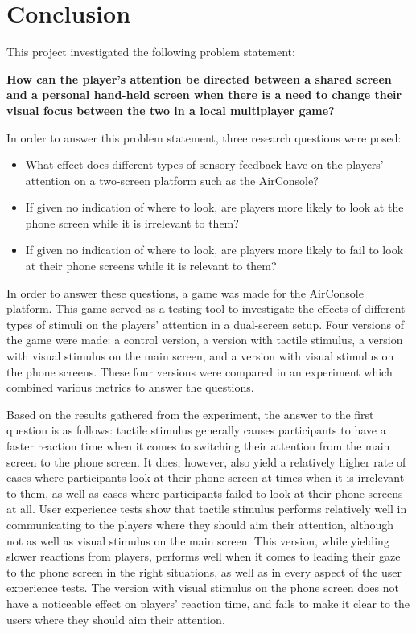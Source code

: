 \chapter{Conclusion}\label{ch:conclusion}
This project investigated the following problem statement:

\begin{changemargin}{1cm}{1cm}
\textbf{How can the player’s attention be directed between a shared screen and a personal hand-held screen when there is a need to change their visual focus between the two in a local multiplayer game?}
\end{changemargin}

In order to answer this problem statement, three research questions were posed:

\begin{itemize}
\item What effect does different types of sensory feedback have on the players' attention on a two-screen platform such as the AirConsole?
\item If given no indication of where to look, are players more likely to look at the phone screen while it is irrelevant to them?
\item If given no indication of where to look, are players more likely to fail to look at their phone screens while it is relevant to them?
\end{itemize}

In order to answer these questions, a game was made for the AirConsole platform. This game served as a testing tool to investigate the effects of different types of stimuli on the players’ attention in a dual-screen setup. Four versions of the game were made: a control version, a version with tactile stimulus, a version with visual stimulus on the main screen, and a version with visual stimulus on the phone screens. These four versions were compared in an experiment which combined various metrics to answer the questions.

Based on the results gathered from the experiment, the answer to the first question is as follows: tactile stimulus generally causes participants to have a faster reaction time when it comes to switching their attention from the main screen to the phone screen. It does, however, also yield a relatively higher rate of cases where participants look at their phone screen at times when it is irrelevant to them, as well as cases where participants failed to look at their phone screens at all. User experience tests show that tactile stimulus performs relatively well in communicating to the players where they should aim their attention, although not as well as visual stimulus on the main screen. This version, while yielding slower reactions from players, performs well when it comes to leading their gaze to the phone screen in the right situations, as well as in every aspect of the user experience tests. The version with visual stimulus on the phone screen does not have a noticeable effect on players’ reaction time, and fails to make it clear to the users where they should aim their attention.

